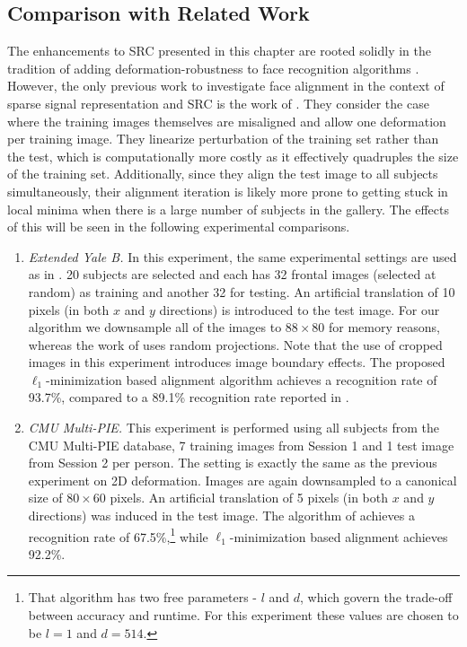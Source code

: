 \subsection{Comparison with Related Work}
The enhancements to SRC presented in this chapter are rooted 
solidly in the tradition of
adding deformation-robustness to face recognition algorithms
\cite{Cootes2001-PAMI,Gross2006-PAMI,Wiskott1997-PAMI}.
However, the only previous work to investigate face alignment
in the context of sparse signal representation and SRC is the
work of \cite{Huang2008-CVPR}. They consider the case where the
training images themselves are misaligned and allow one
deformation per training image. They linearize perturbation of the training
set rather than the test, which is computationally more costly as
it effectively quadruples the size of the training set. 
Additionally, since they align the test image to all subjects
simultaneously, their alignment iteration is likely more prone 
to getting stuck in local minima when there is a large number
of subjects in the gallery.  The effects of this will be seen
in the following experimental comparisons.
\begin{enumerate}
\item {\em Extended Yale B.} In this experiment, the
    same experimental settings are used as in
    \cite{Huang2008-CVPR}. 20 subjects are selected and
    each has 32 frontal images (selected at random) as
    training and another 32 for testing. An artificial
    translation of 10 pixels (in both $x$ and $y$
    directions) is introduced to the test image. For our
    algorithm we downsample all of the images to $88\times
    80$ for memory reasons, whereas the work of
    \cite{Huang2008-CVPR} uses random projections.
	Note that the use of cropped images in this 
	experiment introduces image boundary effects.
    The proposed $\ell_1$-minimization based alignment
    algorithm achieves a recognition rate of 93.7\%,
    compared to a 89.1\% recognition rate reported in
    \cite{Huang2008-CVPR}.
\item {\em CMU Multi-PIE.} This experiment is performed
	using
    all subjects from the CMU Multi-PIE database, 7
    training images from Session 1 and 1 test image from
    Session 2 per person. The setting is exactly the same
    as the previous experiment on 2D deformation. Images are again
    downsampled to a canonical size of $80\times 60$ pixels. An
    artificial translation of 5 pixels (in both $x$ and $y$
    directions) was induced in the test image. The
    algorithm of \cite{Huang2008-CVPR} achieves a
    recognition rate of 67.5\%,\footnote{That algorithm has
    two free parameters - $l$ and $d$, which govern the trade-off between
	accuracy and runtime. For this experiment
    these values are chosen to be $l = 1$ and $d = 514$.} while 
	$\ell_1$-minimization based alignment achieves 92.2\%.
    \end{enumerate}
				
